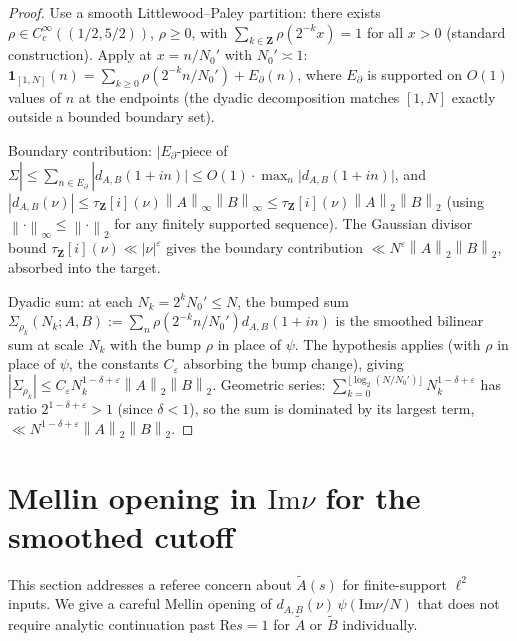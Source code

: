 \documentclass[11pt]{article}
\theoremstyle{definition}
\newcommand{\Z}{\mathbf{Z}}
\newcommand{\Zi}{\Z[i]}
\renewcommand{\Re}{\mathrm{Re}}
\renewcommand{\Im}{\mathrm{Im}}
\newcommand{\norm}[1]{\left\lVert #1\right\rVert}
\begin{document}
\begin{proof}
Use a smooth Littlewood--Paley partition: there exists $\rho\in C_c^\infty((1/2,5/2))$, $\rho\ge 0$, with $\sum_{k\in\Z}\rho(2^{-k}x)=1$ for all $x>0$ (standard construction). Apply at $x=n/N_0'$ with $N_0'\asymp 1$: $\mathbf 1_{[1,N]}(n)=\sum_{k\ge 0}\rho(2^{-k}n/N_0')+E_\partial(n)$, where $E_\partial$ is supported on $O(1)$ values of $n$ at the endpoints (the dyadic decomposition matches $[1,N]$ exactly outside a bounded boundary set).

Boundary contribution: $|E_\partial$-piece of $\Sigma|\le\sum_{n\in E_\partial}|d_{A,B}(1+in)|\le O(1)\cdot\max_n|d_{A,B}(1+in)|$, and $|d_{A,B}(\nu)|\le\tau_\Zi(\nu)\norm{A}_\infty\norm{B}_\infty\le\tau_\Zi(\nu)\norm{A}_2\norm{B}_2$ (using $\norm{\cdot}_\infty\le\norm{\cdot}_2$ for any finitely supported sequence). The Gaussian divisor bound $\tau_\Zi(\nu)\ll|\nu|^\varepsilon$ gives the boundary contribution $\ll N^\varepsilon\norm{A}_2\norm{B}_2$, absorbed into the target.

Dyadic sum: at each $N_k=2^kN_0'\le N$, the bumped sum $\Sigma_{\rho_k}(N_k;A,B):=\sum_n\rho(2^{-k}n/N_0')d_{A,B}(1+in)$ is the smoothed bilinear sum at scale $N_k$ with the bump $\rho$ in place of $\psi$. The hypothesis applies (with $\rho$ in place of $\psi$, the constants $C_\varepsilon$ absorbing the bump change), giving $|\Sigma_{\rho_k}|\le C_\varepsilon N_k^{1-\delta+\varepsilon}\norm{A}_2\norm{B}_2$. Geometric series: $\sum_{k=0}^{\lfloor\log_2(N/N_0')\rfloor}N_k^{1-\delta+\varepsilon}$ has ratio $2^{1-\delta+\varepsilon}>1$ (since $\delta<1$), so the sum is dominated by its largest term, $\ll N^{1-\delta+\varepsilon}\norm{A}_2\norm{B}_2$.
\end{proof}


\section{Mellin opening in $\Im\nu$ for the smoothed cutoff}\label{sec:mellin}

This section addresses a referee concern about $\widetilde A(s)$ for finite-support $\ell^2$ inputs. We give a careful Mellin opening of $d_{A,B}(\nu)\,\psi(\Im\nu/N)$ that does not require analytic continuation past $\Re s=1$ for $\widetilde A$ or $\widetilde B$ individually.
\end{document}
